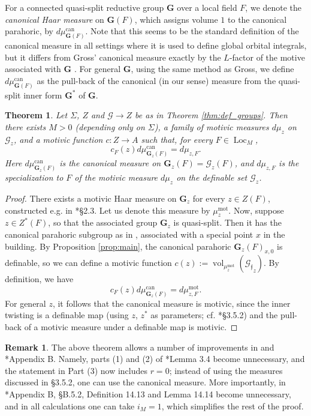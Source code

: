 \documentclass{amsart}
\newcommand{\cG}{\mathcal{G}}
\DeclareMathOperator{\vol}{vol}
\DeclareMathOperator{\loc}{Loc}
\newcommand{\bG}{\mathbf{G}}
\newcommand{\can}{\mathrm{can}}
\newcommand{\ff}{{\mathfrak f}}
\newcommand\mot{\mathrm{mot}}
\theoremstyle{plain}
\newtheorem{theorem}[thm]{Theorem}
\theoremstyle{definition}
\newtheorem{rem}[thm]{Remark}
\begin{document}
For a connected quasi-split reductive group $\bG$ over a local field $F$, we denote the \emph{canonical Haar measure}
on $\bG(F)$, which assigns volume $1$ to the canonical parahoric, by $d\mu_{\bG(F)}^\can$. 
Note that this seems to be the standard definition of the canonical measure in all settings
where it is used to define global orbital integrals, but it differs from Gross' canonical measure
exactly by the $L$-factor of the motive associated with $\bG$ \cite{gross:motive}.  For general $\bG$, using the same method as Gross, 
we define $d\mu_{\bG(F)}^\can$ as the pull-back of the canonical (in our sense) measure from the quasi-split inner form $\bG^\ast$ of $\bG$.  

\begin{theorem}\label{thm:mot_meas}
 Let $\Sigma$, $Z$  and $\cG \to Z$ be as in Theorem \ref{thm:def_groups}. 
Then there exists $M>0$ (depending only on $\Sigma$), a family of  motivic measures
$d\mu_z$ on $\cG_z$, and a motivic function $c:Z\to A$ such that, for every $F\in \loc_M$,
\[
c_F(z) d\mu_{\bG_z(F)}^\can = d\mu_{z, F}.
\]
Here $d\mu_{\bG_z(F)}^\can$ is the canonical measure on $\bG_z(F)=\cG_z(F)$,
and $d\mu_{z, F}$ is the specialization to $F$ of the motivic measure $d\mu_z$ on the definable set $\cG_z$. 
\end{theorem} 

\begin{proof} There exists a motivic Haar measure on $\bG_z$ for every $z\in Z(F)$,
constructed e.g. in \cite{hales:transfert}*{\S 2.3}. Let us denote this measure by $\mu_z^\mot$. Now, suppose 
$z\in Z^\ast(F)$, so that the associated group $\bG_z$ is quasi-split.  
Then it has the canonical parahoric subgroup as in \cite{gross:motive}, associated with a special point $x$ in the building. 
By Proposition \ref{prop:main}, the canonical parahoric $\bG_z(F)_{x, 0}$ is definable, so we can define  a motivic function $c(z):=\vol_{\mu_z^\mot}({\cG_{\ff}}_z)$. 
By definition, we have 
\[
c_F(z) d\mu_{\bG_z(F)}^\can = d\mu_{z, F}^\mot.
\]
For general $z$, it follows that the canonical measure is motivic, since the inner twisting is a definable map
(using $z$, $z^\ast$ as parameters; cf. \cite{CGH-2}*{\S 3.5.2}) and the pull-back of a motivic measure under a definable map is motivic.
\end{proof}

\begin{rem} The above theorem allows a number of improvements in \cite{CGH-2} and 
\cite{S-T}*{Appendix B}. 
Namely,  parts (1) and (2) of \cite{CGH-2}*{Lemma 3.4} become unnecessary, and the statement in Part (3)
now includes $r=0$; instead of using the measures discussed in \S 3.5.2, one can use the canonical measure. 
More importantly, in \cite{S-T}*{Appendix B, \S B.5.2}, Definition 14.13 and Lemma 14.14
become unnecessary, and in all calculations one can take $i_M=1$, which simplifies the rest of the proof.
\end{rem}
\end{document}
